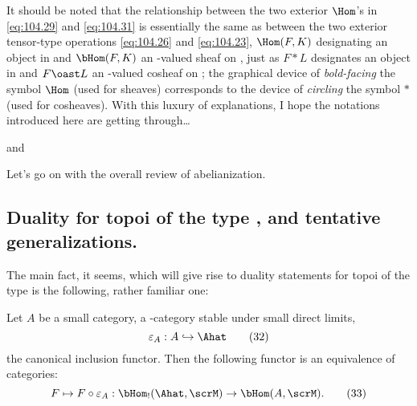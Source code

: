 \begin{comments}
  It should be noted that the relationship between the two exterior
  $\Hom$'s in \eqref{eq:104.29} and \eqref{eq:104.31} is essentially
  the same as between the two exterior tensor-type operations
  \eqref{eq:104.26} and \eqref{eq:104.23}, $\Hom(F,K)$ designating an
  object in \scrN{} and $\bHom(F,K)$ an \scrN-valued sheaf on \scrA,
  just as $F*L$ designates an object in \scrM{} and $F\oast L$ an
  \scrM-valued cosheaf on \scrA; the graphical device of
  \emph{bold-facing}
  the symbol $\Hom$ (used for sheaves) corresponds to the device of
  \emph{circling} the symbol $*$ (used for cosheaves). With this
  luxury of explanations, I hope the notations introduced here are
  getting through\ldots
\end{comments}

\bigbreak

\presectionfill{} and \par

\label{sec:105}%
Let's go on with the overall review of abelianization.
\addtocounter{subsection}{3}

\subsection{Duality for topoi of the type
  \texorpdfstring{\Ahat}{Ahat}, and tentative generalizations.}
\label{subsec:105.D}
The main fact, it seems, which will give rise to duality statements
for topoi of the type \Ahat{} is the following, rather familiar one:
\addtocounter{propositionnum}{2}
\begin{propositionnum}\label{prop:105.3}
  Let $A$ be a small category, \scrM{} a \scrU-category stable under
  small direct limits,
  \begin{equation}
    \label{eq:105.32}
    \varepsilon_A:A\hookrightarrow\Ahat\tag{32}
  \end{equation}
  the canonical inclusion functor. Then the following functor is an
  equivalence of categories:
  \begin{equation}
    \label{eq:105.33}
    F\mapsto F\circ\varepsilon_A: \bHom_!(\Ahat,\scrM) \to \bHom(A,\scrM).\tag{33}
  \end{equation}
\end{propositionnum}

